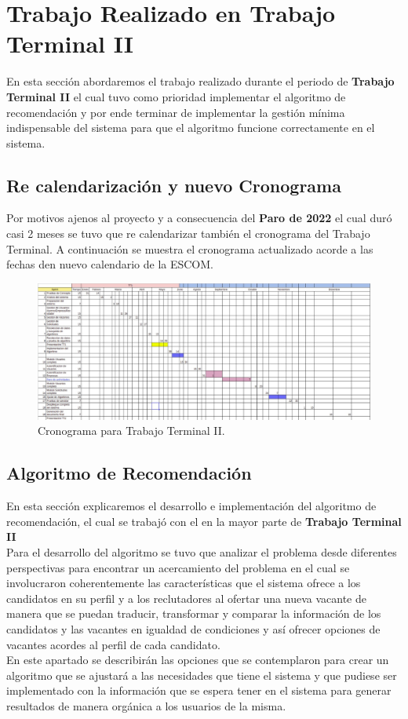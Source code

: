 \clearpage
\section{Trabajo Realizado en Trabajo Terminal II}
En esta sección abordaremos el trabajo realizado durante el periodo de \textbf{Trabajo Terminal II} el cual tuvo como prioridad implementar el algoritmo de recomendación y por ende
terminar de implementar la gestión mínima indispensable del sistema para que el algoritmo funcione correctamente en el sistema.

\subsection{Re calendarización y nuevo Cronograma}
Por motivos ajenos al proyecto y a consecuencia del \textbf{Paro de 2022} el cual duró casi 2 meses se tuvo que re calendarizar también el cronograma del Trabajo Terminal.
A continuación se muestra el cronograma actualizado acorde a las fechas den nuevo calendario de la ESCOM.
\begin{figure}[H]
    \begin{center}
        \includegraphics[width=.8\textwidth]{desarrollo/imagenes/cronograma.png}
    \end{center}
    \caption{Cronograma para Trabajo Terminal II.}
    \label{mark:top}
\end{figure}
 \clearpage

\subsection{Algoritmo de Recomendación}
En esta sección explicaremos  el desarrollo e implementación del algoritmo de recomendación, el cual se trabajó con el en la mayor parte de \textbf{Trabajo Terminal II}\\
\newline
Para el desarrollo del algoritmo se tuvo que analizar el problema desde diferentes perspectivas para encontrar un acercamiento del problema en el cual se involucraron coherentemente las características que el sistema ofrece a los candidatos en su perfil y a los reclutadores al ofertar una nueva vacante de manera que se puedan traducir, transformar y comparar la información de los candidatos y las vacantes en igualdad de condiciones y así ofrecer opciones de vacantes acordes al perfil de cada candidato. \\
\newline
En este apartado se describirán las opciones que se contemplaron para crear un algoritmo que se ajustará a las necesidades que tiene el sistema y que pudiese ser implementado con la información que se espera tener en el sistema para generar resultados de manera orgánica a los usuarios de la misma.
